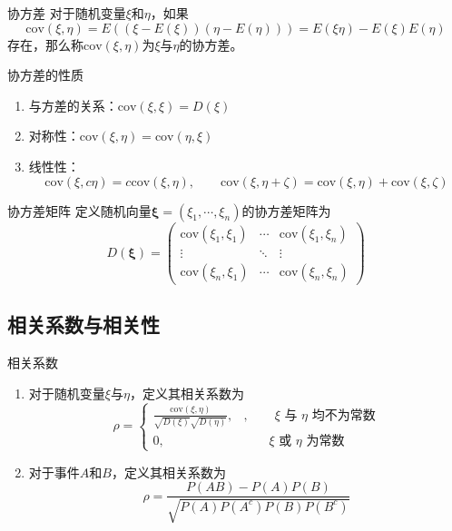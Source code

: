 \documentclass[lang = cn, scheme = chinese, thmcnt = section]{elegantbook}
\newcommand{\bs}{\boldsymbol}          %
\begin{document}
\begin{definition}{协方差}
	对于随机变量$\xi$和$\eta$，如果
	$$
	\mathrm{cov}(\xi,\eta)
	=E((\xi-E(\xi))(\eta-E(\eta)))
	=E(\xi\eta)-E(\xi)E(\eta)
	$$
	存在，那么称$\mathrm{cov}(\xi,\eta)$为$\xi$与$\eta$的协方差。
\end{definition}

\begin{proposition}{协方差的性质}
	\begin{enumerate}
		\item 与方差的关系：$\mathrm{cov}(\xi,\xi)=D(\xi)$
		\item 对称性：$\mathrm{cov}(\xi,\eta)=\mathrm{cov}(\eta,\xi)$
		\item 线性性：%
		$$
		\mathrm{cov}(\xi,c\eta)=c\mathrm{cov}(\xi,\eta),\qquad 
		\mathrm{cov}(\xi,\eta+\zeta)=\mathrm{cov}(\xi,\eta)+\mathrm{cov}(\xi,\zeta)
		$$
	\end{enumerate}
\end{proposition}

\begin{definition}{协方差矩阵}
	定义随机向量$\bs{\xi}=(\xi_1,\cdots,\xi_n)$的协方差矩阵为
	$$
	D(\bs{\xi})=\left(
	\begin{matrix}
		\mathrm{cov}(\xi_1,\xi_1)&\cdots&\mathrm{cov}(\xi_1,\xi_n)\\
		\vdots&\ddots&\vdots\\
		\mathrm{cov}(\xi_n,\xi_1)&\cdots&\mathrm{cov}(\xi_n,\xi_n)
	\end{matrix}
	\right)
	$$
\end{definition}

\subsection{相关系数与相关性}

\begin{definition}{相关系数}
	\begin{enumerate}
		\item 对于随机变量$\xi$与$\eta$，定义其相关系数为%
		$$
		\rho=\begin{cases}
			\frac{\mathrm{cov}(\xi,\eta)}{\sqrt{D(\xi)}\sqrt{D(\eta)}},&,\qquad\xi\text{ 与 }\eta\text{ 均不为常数}\\
			0,&\qquad \xi\text{ 或 }\eta\text{ 为常数}
		\end{cases}
		$$
		\item 对于事件$A$和$B$，定义其相关系数为%
		$$
		\rho=\frac{P(AB)-P(A)P(B)}{\sqrt{P(A)P(A^c)P(B)P(B^c)}}
		$$
	\end{enumerate}
\end{definition}
\end{document}
